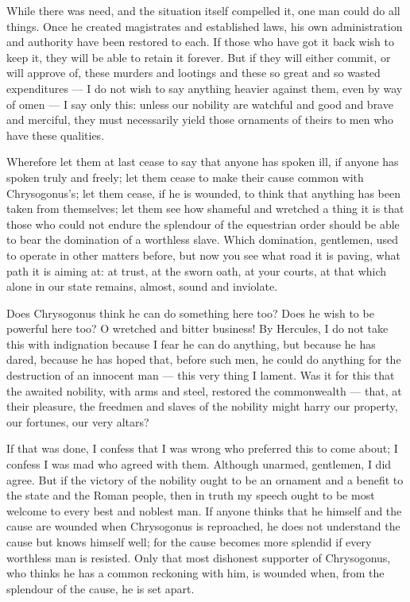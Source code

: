  While there was need, and the situation itself compelled it, one man could do all things. Once he created magistrates and established laws, his own administration and authority have been restored to each. If those who have got it back wish to keep it, they will be able to retain it forever. But if they will either commit, or will approve of, these murders and lootings and these so great and so wasted expenditures --- I do not wish to say anything heavier against them, even by way of omen --- I say only this: unless our nobility are watchful and good and brave and merciful, they must necessarily yield those ornaments of theirs to men who have these qualities.

 Wherefore let them at last cease to say that anyone has spoken ill, if anyone has spoken truly and freely; let them cease to make their cause common with Chrysogonus's; let them cease, if he is wounded, to think that anything has been taken from themselves; let them see how shameful and wretched a thing it is that those who could not endure the splendour of the equestrian order should be able to bear the domination of a worthless slave. Which domination, gentlemen, used to operate in other matters before, but now you see what road it is paving, what path it is aiming at: at trust, at the sworn oath, at your courts, at that which alone in our state remains, almost, sound and inviolate.

 Does Chrysogonus think he can do something here too? Does he wish to be powerful here too? O wretched and bitter business! By Hercules, I do not take this with indignation because I fear he can do anything, but because he has dared, because he has hoped that, before such men, he could do anything for the destruction of an innocent man --- this very thing I lament. Was it for this that the awaited nobility, with arms and steel, restored the commonwealth --- that, at their pleasure, the freedmen and slaves of the nobility might harry our property, our fortunes, our very altars?

 If that was done, I confess that I was wrong who preferred this to come about; I confess I was mad who agreed with them. Although unarmed, gentlemen, I did agree. But if the victory of the nobility ought to be an ornament and a benefit to the state and the Roman people, then in truth my speech ought to be most welcome to every best and noblest man. If anyone thinks that he himself and the cause are wounded when Chrysogonus is reproached, he does not understand the cause but knows himself well; for the cause becomes more splendid if every worthless man is resisted. Only that most dishonest supporter of Chrysogonus, who thinks he has a common reckoning with him, is wounded when, from the splendour of the cause, he is set apart.

